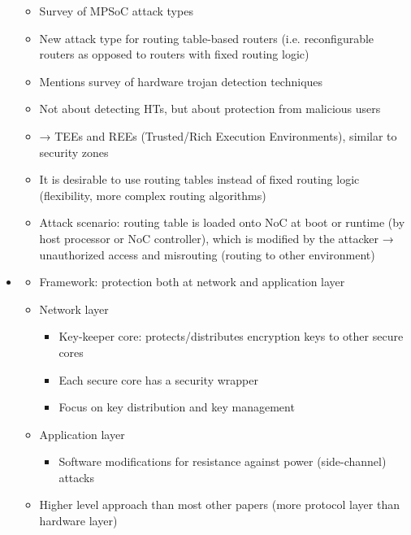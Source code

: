 \documentclass[
	paper=a4,
	fontsize=11pt,
	parskip=full %
]{scrreprt}
\begin{document}
\begin{itemize}
            \begin{itemize}
                \item Survey of MPSoC attack types
                \item New attack type for routing table-based routers (i.e. reconfigurable routers as opposed to routers with fixed routing logic)
                \item Mentions survey of hardware trojan detection techniques
                \item Not about detecting HTs, but about protection from malicious users
                \item → TEEs and REEs (Trusted/Rich Execution Environments), similar to security zones
                \item It is desirable to use routing tables instead of fixed routing logic (flexibility, more complex routing algorithms)
                \item Attack scenario: routing table is loaded onto NoC at boot or runtime (by host processor or NoC controller), which is modified by
                    the attacker → unauthorized access and misrouting (routing to other environment)
            \end{itemize}
        \item \textbf{}
            \begin{itemize}
                \item Framework: protection both at network and application layer
                \item Network layer
                    \begin{itemize}
                        \item Key-keeper core: protects/distributes encryption keys to other secure cores
                        \item Each secure core has a security wrapper
                        \item Focus on key distribution and key management
                    \end{itemize}
                \item Application layer
                    \begin{itemize}
                        \item Software modifications for resistance against power (side-channel) attacks
                    \end{itemize}
                \item Higher level approach than most other papers (more protocol layer than hardware layer)

\end{itemize}
\end{itemize}
\end{document}
